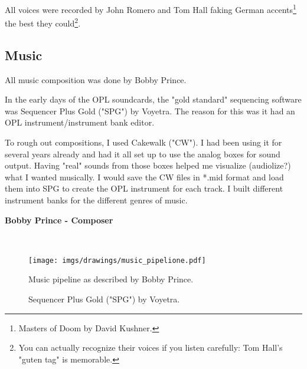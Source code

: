 \documentclass[book.tex]{subfiles}
\begin{document}
\par
All voices were recorded by John Romero and Tom Hall faking German accents\footnote{Masters of Doom by David Kushner.} the best they could\footnote{You can actually recognize their voices if you listen carefully: Tom Hall's "guten tag" is memorable.}.






\subsection{Music}
All music composition was done by Bobby Prince.\\
\par
 \begin{fancyquotes}
In the early days of the OPL soundcards, the "gold standard" sequencing software was Sequencer Plus Gold ("SPG") by Voyetra. The reason for this was it had an OPL instrument/instrument bank editor.\\
\par
To rough out compositions, I used Cakewalk ("CW"). I had been using it for several years already and had it all set up to use the analog boxes for sound output. Having "real" sounds from those boxes helped me visualize (audiolize?) what I wanted musically. I would save the CW files in *.mid format and load them into SPG to create the OPL instrument for each track. I built different instrument banks for the different genres of music.\\
\par

\textbf{Bobby Prince - Composer}
 \end{fancyquotes}\\
 \par
\begin{figure}[H]
\centering

 \texttt{[image: imgs/drawings/music\_pipelione.pdf]}
 \caption{Music pipeline as described by Bobby Prince.}
\end{figure}
\par


\begin{figure}[H]
\centering
\caption{Sequencer Plus Gold ("SPG") by Voyetra.}
\end{figure}
\end{document}
